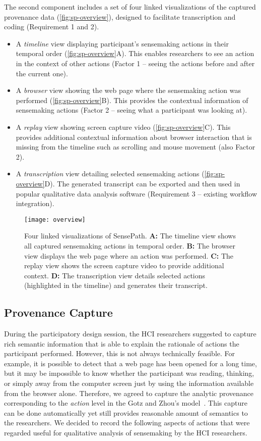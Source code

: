 The second component includes a set of four linked visualizations of the captured provenance data (\autoref{fig:sp-overview}), designed to facilitate transcription and coding (Requirement 1 and 2).

\begin{itemize}
\item A \emph{timeline} view displaying participant's sensemaking actions in their temporal order (\autoref{fig:sp-overview}A). This enables researchers to see an action in the context of other actions (Factor 1 -- seeing the actions before and after the current one).
\item A \emph{browser} view showing the web page where the sensemaking action was performed (\autoref{fig:sp-overview}B). This provides the contextual information of sensemaking actions (Factor 2 -- seeing what a participant was looking at).
\item A \emph{replay} view showing screen capture video (\autoref{fig:sp-overview}C). This provides additional contextual information about browser interaction that is missing from the timeline such as scrolling and mouse movement (also Factor 2).
\item A \emph{transcription} view detailing selected sensemaking actions (\autoref{fig:sp-overview}D). The generated transcript can be exported and then used in popular qualitative data analysis software (Requirement 3 -- existing workflow integration).
\end{itemize}

\begin{figure}[!htb]
 	\centering
 	\texttt{[image: overview]}
 	\caption{Four linked visualizations of SensePath. \textbf{A:} The timeline view shows all captured sensemaking actions in temporal order. \textbf{B:} The browser view displays the web page where an action was performed. \textbf{C:} The replay view shows the screen capture video to provide additional context. \textbf{D:} The transcription view details selected actions (highlighted in the timeline) and generates their transcript.}
 	\label{fig:sp-overview}
\end{figure}

\subsection{Provenance Capture}
\label{sub:sp-provenance}
During the participatory design session, the HCI researchers suggested to capture rich semantic  information that is able to explain the rationale of actions the participant performed. However, this is not always technically feasible. For example, it is possible to detect that a web page has been opened for a long time, but it may be impossible to know whether the participant was reading, thinking, or simply away from the computer screen just by using the information available from the browser alone. Therefore, we agreed to capture the analytic provenance corresponding to the \emph{action} level in the Gotz and Zhou's model~\cite{Gotz2009}. This capture can be done automatically yet still provides reasonable amount of semantics to the researchers. We decided to record the following aspects of actions that were regarded useful for qualitative analysis of sensemaking by the HCI researchers.

